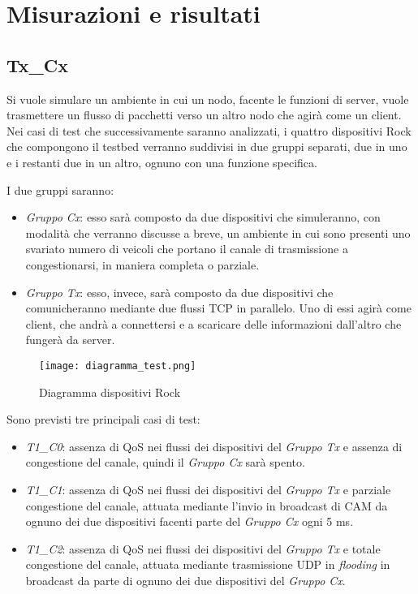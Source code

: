 \chapter{Misurazioni e risultati}

\section{Tx\_Cx}
Si vuole simulare un ambiente in cui un nodo, facente le funzioni di server, vuole trasmettere un flusso di pacchetti verso un altro nodo che agirà come un client. 
Nei casi di test che successivamente saranno analizzati, i quattro dispositivi Rock che compongono il testbed verranno suddivisi in due gruppi separati, due in uno e i restanti due in un altro, ognuno con una funzione specifica.

I due gruppi saranno:

\begin{itemize}
    \item \textit{Gruppo Cx}: esso sarà composto da due dispositivi che simuleranno, con modalità che verranno discusse a breve, un ambiente in cui sono presenti uno svariato numero di veicoli che portano il canale di trasmissione a congestionarsi, in maniera completa o parziale.
    \item \textit{Gruppo Tx}: esso, invece, sarà composto da due dispositivi che comunicheranno mediante due flussi TCP in parallelo. Uno di essi agirà come client, che andrà a connettersi e a scaricare delle informazioni dall'altro che fungerà da server.
\end{itemize}

\begin{figure}[h!]
    \centering
    \texttt{[image: diagramma\_test.png]}
    \caption{Diagramma dispositivi Rock}
    \label{fig:diagramma}
\end{figure}

Sono previsti tre principali casi di test:

\begin{itemize}
    \item \textit{T1\_C0}: assenza di QoS nei flussi dei dispositivi del \textit{Gruppo Tx} e assenza di congestione del canale, quindi il \textit{Gruppo Cx} sarà spento.
    \item \textit{T1\_C1}: assenza di QoS nei flussi dei dispositivi del \textit{Gruppo Tx} e parziale congestione del canale, attuata mediante l'invio in broadcast di CAM da ognuno dei due dispositivi facenti parte del \textit{Gruppo Cx} ogni 5 ms.
    \item \textit{T1\_C2}: assenza di QoS nei flussi dei dispositivi del \textit{Gruppo Tx} e totale congestione del canale, attuata mediante trasmissione UDP in \textit{flooding} in broadcast da parte di ognuno dei due dispositivi del \textit{Gruppo Cx}.
\end{itemize}

